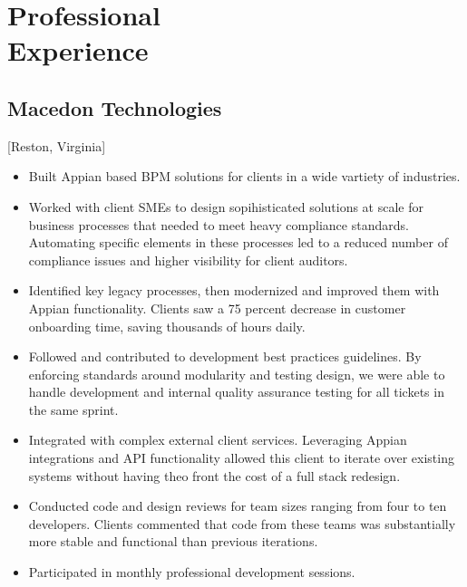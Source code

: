\documentclass{mycv}
\begin{document}
\maketitle%

\section{Professional \\ Experience}

\subsection{Macedon Technologies}[Reston, Virginia]
\begin{positions}
\end{positions}

\begin{itemize}
  \item Built Appian based BPM solutions for clients in a wide vartiety of industries.
  \item Worked with client SMEs to design sopihisticated solutions at scale for business processes that needed to meet heavy compliance standards. Automating specific elements in these processes led to a reduced number  of compliance issues and higher visibility for client auditors.
  \item Identified key legacy processes, then modernized and improved them with Appian functionality. Clients saw a 75 percent decrease in customer onboarding time, saving thousands of hours daily.
  \item Followed and contributed to development best practices guidelines. By enforcing standards around modularity and testing design, we were able to handle development and internal quality assurance testing for all tickets in the same sprint.
  \item Integrated with complex external client services. Leveraging Appian integrations and API functionality allowed this client to iterate over existing systems without having theo front the cost of a full stack redesign.
  \item Conducted code and design reviews for team sizes ranging from four to ten developers. Clients commented that code from these teams was substantially more stable and functional than previous iterations.
  \item Participated in monthly professional development sessions.
\end{itemize}
\end{document}

